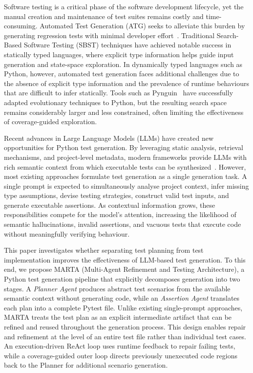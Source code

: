 \documentclass{llncs}
\begin{document}
Software testing is a critical phase of the software development lifecycle, yet the manual creation and maintenance of test suites remains costly and time-consuming. Automated Test Generation (ATG) seeks to alleviate this burden by generating regression tests with minimal developer effort~\cite{fraser2011evosuite,lukasczyk2022pynguin}. Traditional Search-Based Software Testing (SBST) techniques have achieved notable success in statically typed languages, where explicit type information helps guide input generation and state-space exploration. In dynamically typed languages such as Python, however, automated test generation faces additional challenges due to the absence of explicit type information and the prevalence of runtime behaviours that are difficult to infer statically. Tools such as Pynguin~\cite{lukasczyk2022pynguin} have successfully adapted evolutionary techniques to Python, but the resulting search space remains considerably larger and less constrained, often limiting the effectiveness of coverage-guided exploration.

Recent advances in Large Language Models (LLMs) have created new opportunities for Python test generation. By leveraging static analysis, retrieval mechanisms, and project-level metadata, modern frameworks provide LLMs with rich semantic context from which executable tests can be synthesized~\cite{altmayer2025coverup,test4py2025,ryan2024code}. However, most existing approaches formulate test generation as a single generation task. A single prompt is expected to simultaneously analyse project context, infer missing type assumptions, devise testing strategies, construct valid test inputs, and generate executable assertions. As contextual information grows, these responsibilities compete for the model's attention, increasing the likelihood of semantic hallucinations, invalid assertions, and vacuous tests that execute code without meaningfully verifying behaviour.

This paper investigates whether separating test planning from test implementation improves the effectiveness of LLM-based test generation. To this end, we propose MARTA (Multi-Agent Refinement and Testing Architecture), a Python test generation pipeline that explicitly decomposes generation into two stages. A \textit{Planner Agent} produces abstract test scenarios from the available semantic context without generating code, while an \textit{Assertion Agent} translates each plan into a complete Pytest file. Unlike existing single-prompt approaches, MARTA treats the test plan as an explicit intermediate artifact that can be refined and reused throughout the generation process. This design enables repair and refinement at the level of an entire test file rather than individual test cases. An execution-driven ReAct loop uses runtime feedback to repair failing tests, while a coverage-guided outer loop directs previously unexecuted code regions back to the Planner for additional scenario generation.
\end{document}
